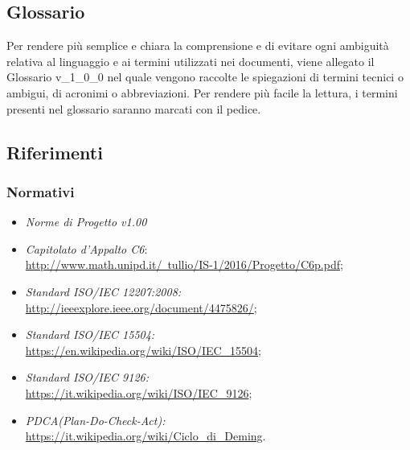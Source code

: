	\subsection{Glossario}
	Per rendere più semplice e chiara la comprensione e di evitare ogni ambiguità relativa al linguaggio e ai termini utilizzati nei documenti, viene allegato il Glossario v_1_0_0 nel quale vengono raccolte le spiegazioni di termini tecnici o ambigui, di acronimi o abbreviazioni. Per rendere più facile la lettura, i termini presenti nel glossario saranno marcati con il pedice.
	
	\subsection{Riferimenti}
		\subsubsection{Normativi}
		\begin{itemize}
			\item \textit{Norme di Progetto v1.00}
			\item \textit{Capitolato d'Appalto C6}:
			\\ \href{http://www.math.unipd.it/~tullio/IS-1/2016/Progetto/C6p.pdf}{http://www.math.unipd.it/~tullio/IS-1/2016/Progetto/C6p.pdf};
			\item \textit{Standard ISO/IEC 12207:2008:}
			\\ \href{http://ieeexplore.ieee.org/document/4475826/}{http://ieeexplore.ieee.org/document/4475826/};
			\item \textit{Standard ISO/IEC 15504:}
			\\ \href{https://en.wikipedia.org/wiki/ISO/IEC_15504}{https://en.wikipedia.org/wiki/ISO/IEC_15504};
			\item \textit{Standard ISO/IEC 9126:}
			\\ \href{https://it.wikipedia.org/wiki/ISO/IEC_9126}{https://it.wikipedia.org/wiki/ISO/IEC_9126};
			\item \textit{PDCA(Plan-Do-Check-Act):}
			\\ \href{https://it.wikipedia.org/wiki/Ciclo_di_Deming}{https://it.wikipedia.org/wiki/Ciclo_di_Deming}.
		\end{itemize}
